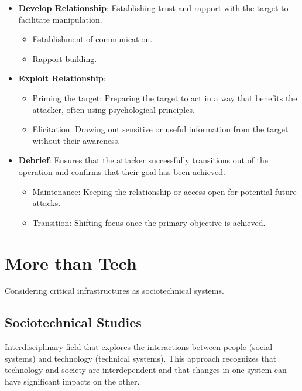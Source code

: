\begin{itemize}
    \item \textbf{Develop Relationship}: Establishing trust and rapport with the target to facilitate manipulation.
        \begin{itemize}
            \item Establishment of communication.
            \item Rapport building.
        \end{itemize}
    \item \textbf{Exploit Relationship}:
    \begin{itemize}
        \item Priming the target: Preparing the target to act in a way that benefits the attacker, often using psychological principles.
        \item Elicitation: Drawing out sensitive or useful information from the target without their awareness.
    \end{itemize}
    \item \textbf{Debrief}: Ensures that the attacker successfully transitions out of the operation and confirms that their goal has been achieved.
    \begin{itemize}
        \item Maintenance: Keeping the relationship or access open for potential future attacks.
        \item Transition: Shifting focus once the primary objective is achieved.
    \end{itemize}
\end{itemize}

\section{More than Tech}
\begin{center}
    Considering critical infrastructures as sociotechnical systems.
\end{center}
\subsection{Sociotechnical Studies}
Interdisciplinary field that explores the interactions between people (social systems) and technology (technical systems). This approach recognizes that technology and society are interdependent and that changes in one system can have significant impacts on the other.

\vspace{0.5cm}


